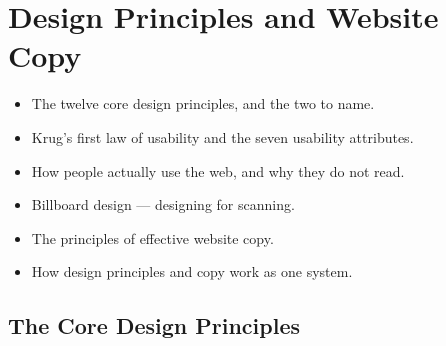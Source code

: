\documentclass{MMTextbook}
\begin{document}
\chapter{Design Principles and Website Copy}


\begin{learningoutcomes}
\begin{itemize}
\item The twelve core design principles, and the two to name.
\item Krug's first law of usability and the seven usability attributes.
\item How people actually use the web, and why they do not read.
\item Billboard design --- designing for scanning.
\item The principles of effective website copy.
\item How design principles and copy work as one system.
\end{itemize}
\end{learningoutcomes}

\section{The Core Design Principles}
\end{document}
